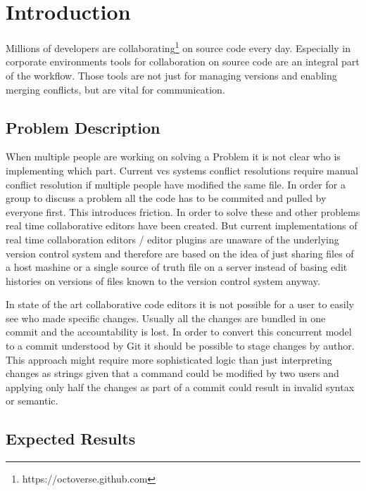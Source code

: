 \chapter{Introduction}
\label{sec:introduction}

Millions of developers are collaborating\footnote{https://octoverse.github.com} on source code every day.
Especially in corporate environments tools for collaboration on source code are an integral part of the workflow.
Those tools are not just for managing versions and enabling merging conflicts, but are vital for communication.

\section{Problem Description}

When multiple people are working on solving a Problem it is not clear who is implementing which part. Current vcs systems conflict resolutions require manual conflict resolution if multiple people have modified the same file.
In order for a group to discuss a problem all the code has to be commited and pulled by everyone first. This introduces friction. In order to solve these and other problems real time collaborative editors have been created.
But current implementations of real time collaboration editors / editor plugins are unaware of the underlying version control system and therefore are based on the idea of just sharing files of a host mashine or a single source of truth file on a server instead of basing edit histories on versions of files known to the version control system anyway.

In state of the art collaborative code editors it is not possible for a user to easily see who made specific changes. Usually all the changes are bundled in one commit and the accountability is lost. In order to convert this concurrent model to a commit understood by Git it should be possible to stage changes by author. This approach might require more sophisticated logic than just interpreting changes as strings given that a command could be modified by two users and applying only half the changes as part of a commit could result in invalid syntax or semantic.

\section{Expected Results}

